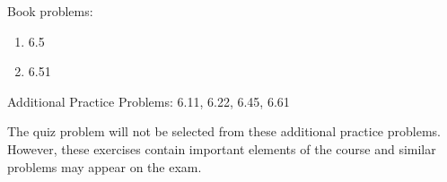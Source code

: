 
Book problems:
\begin{enumerate}
  \item 6.5
  \item 6.51
\end{enumerate}

Additional Practice Problems: 6.11, 6.22, 6.45, 6.61

\noindent The quiz problem will not be selected from these additional practice problems.  However, these exercises contain important elements of the course and similar problems may appear on the exam.

\iftoggle{flagSoln}{%
\vspace{.5cm}
\rule{\textwidth}{.4pt}
\vspace{.5cm}
\textbf{Solution:}
\begin{enumerate}
  \item[6.5] $F_{BD} = 0$, $F_{AC} = 5.00$ kips C, $F_{AD} = 13.00$ kips T, $F_{CD} = 30.0$ kips C, $F_{DF} = 5.00$ kips T, $F_{CF} = 32.5$ kips T, $F_{CE} = 17.50$ kips C, $F_{EF} = 0$
  \item[6.51] $F_{DE} = 25.0$ kips T, $F_{DF} = 13.00$ kips C
\end{enumerate}
}{%
}%
